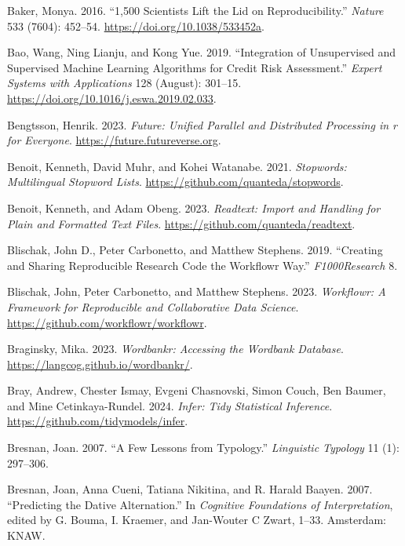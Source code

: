 \documentclass[
  letterpaper,
  DIV=11,
  numbers=noendperiod]{scrreprt}
\newlength{\cslhangindent}
\newenvironment{CSLReferences}[2] %
 {\begin{list}{}{%
  \setlength{\itemindent}{0pt}
  \setlength{\leftmargin}{0pt}
  \setlength{\parsep}{0pt}
  \ifodd #1
   \setlength{\leftmargin}{\cslhangindent}
   \setlength{\itemindent}{-1\cslhangindent}
  \fi
  \setlength{\itemsep}{#2\baselineskip}}}
 {\end{list}}
\theoremstyle{definition}
\theoremstyle{remark}
\begin{document}
\begin{CSLReferences}{1}{0}
Baker, Monya. 2016. {``1,500 Scientists Lift the Lid on
Reproducibility.''} \emph{Nature} 533 (7604): 452--54.
\url{https://doi.org/10.1038/533452a}.

Bao, Wang, Ning Lianju, and Kong Yue. 2019. {``Integration of
Unsupervised and Supervised Machine Learning Algorithms for Credit Risk
Assessment.''} \emph{Expert Systems with Applications} 128 (August):
301--15. \url{https://doi.org/10.1016/j.eswa.2019.02.033}.

Bengtsson, Henrik. 2023. \emph{Future: Unified Parallel and Distributed
Processing in r for Everyone}. \url{https://future.futureverse.org}.

Benoit, Kenneth, David Muhr, and Kohei Watanabe. 2021. \emph{Stopwords:
Multilingual Stopword Lists}.
\url{https://github.com/quanteda/stopwords}.

Benoit, Kenneth, and Adam Obeng. 2023. \emph{Readtext: Import and
Handling for Plain and Formatted Text Files}.
\url{https://github.com/quanteda/readtext}.

Blischak, John D., Peter Carbonetto, and Matthew Stephens. 2019.
{``Creating and Sharing Reproducible Research Code the Workflowr Way.''}
\emph{F1000Research} 8.

Blischak, John, Peter Carbonetto, and Matthew Stephens. 2023.
\emph{Workflowr: A Framework for Reproducible and Collaborative Data
Science}. \url{https://github.com/workflowr/workflowr}.

Braginsky, Mika. 2023. \emph{Wordbankr: Accessing the Wordbank
Database}. \url{https://langcog.github.io/wordbankr/}.

Bray, Andrew, Chester Ismay, Evgeni Chasnovski, Simon Couch, Ben Baumer,
and Mine Cetinkaya-Rundel. 2024. \emph{Infer: Tidy Statistical
Inference}. \url{https://github.com/tidymodels/infer}.

Bresnan, Joan. 2007. {``A Few Lessons from Typology.''} \emph{Linguistic
Typology} 11 (1): 297--306.

Bresnan, Joan, Anna Cueni, Tatiana Nikitina, and R. Harald Baayen. 2007.
{``Predicting the Dative Alternation.''} In \emph{Cognitive Foundations
of Interpretation}, edited by G. Bouma, I. Kraemer, and Jan-Wouter C
Zwart, 1--33. Amsterdam: KNAW.


\end{CSLReferences}
\end{document}
